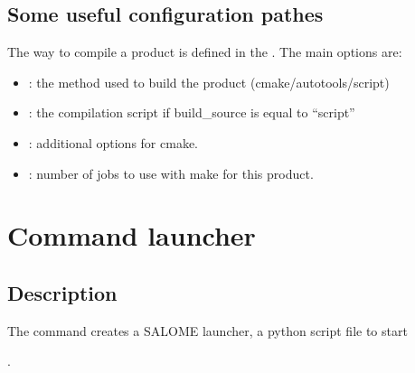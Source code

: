 \documentclass[a4paper,10pt,english]{sphinxmanual}
\begin{document}
\subsection{Some useful configuration pathes}
\label{\detokenize{commands/compile:some-useful-configuration-pathes}}
The way to compile a product is defined in the .
The main options are:
\begin{itemize}
\item {} 
 : the method used to build the product (cmake/autotools/script)

\item {} 
 : the compilation script if build\_source is equal to “script”

\item {} 
 : additional options for cmake.

\item {} 
 : number of jobs to use with make for this product.

\end{itemize}

\clearpage


\section{Command launcher}
\label{\detokenize{commands/launcher:svn}}\label{\detokenize{commands/launcher:command-launcher}}\label{\detokenize{commands/launcher::doc}}

\subsection{Description}
\label{\detokenize{commands/launcher:description}}
The  command creates a SALOME launcher, a python script file to start %
\begin{footnote}[6]\sphinxAtStartFootnote
{}
%
\end{footnote}.
\end{document}
